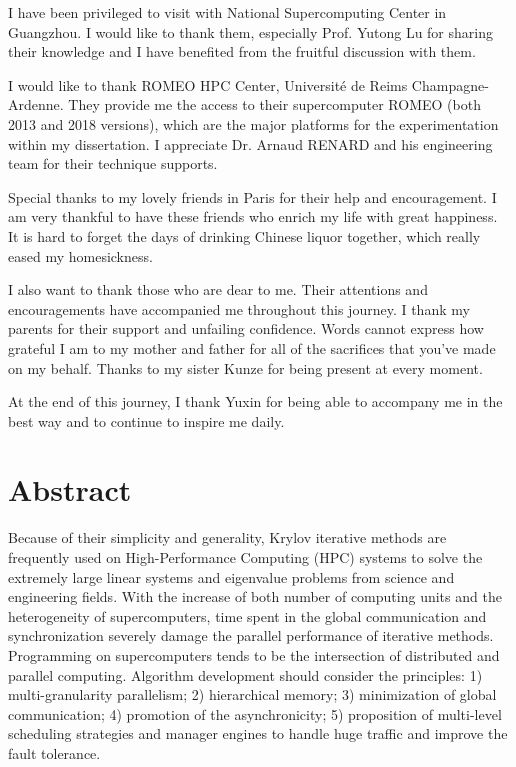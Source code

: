 \documentclass{xinzhewu}
\begin{document}
I have been privileged to visit with National Supercomputing Center in Guangzhou. I would like to thank them, especially Prof. Yutong Lu for sharing their knowledge and I have benefited from the fruitful discussion with them.

I would like to thank ROMEO HPC Center, Universit\'e de Reims Champagne-Ardenne. They provide me the access to their supercomputer ROMEO (both 2013 and 2018 versions), which are the major platforms for the experimentation within my dissertation. I appreciate Dr. Arnaud RENARD and his engineering team for their technique supports.

Special thanks to my lovely friends in Paris for their help and encouragement. I am very thankful to have these friends who enrich my life with great happiness. It is hard to forget the days of drinking Chinese liquor together, which really eased my homesickness.

I also want to thank those who are dear to me. Their attentions and encouragements have accompanied me throughout this journey. I thank my parents for their support and unfailing confidence. Words cannot express how grateful I am to my mother and father for all of the sacrifices that you’ve made on my behalf. Thanks to my sister Kunze for being present at every moment.
	
At the end of this journey, I thank Yuxin for being able to accompany me in the best way and to continue to inspire me daily.


\clearemptydoublepage

\chapter*{Abstract}
\thispagestyle{empty}

Because of their simplicity and generality, Krylov iterative methods are frequently used on High-Performance Computing (HPC) systems to solve the extremely large linear systems and eigenvalue problems from science and engineering fields. With the increase of both number of computing units and the heterogeneity of supercomputers, time spent in the global communication and synchronization severely damage the parallel performance of iterative methods. Programming on supercomputers tends to be the intersection of distributed and parallel computing. Algorithm development should consider the principles: 1) multi-granularity parallelism; 2) hierarchical memory; 3) minimization of global communication; 4) promotion of the asynchronicity; 5) proposition of multi-level scheduling strategies and manager engines to handle huge traffic and improve the fault tolerance. 
\end{document}
